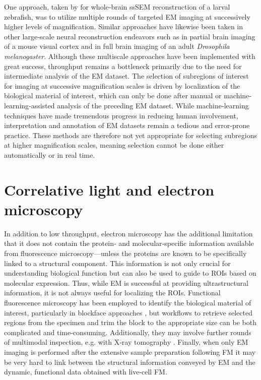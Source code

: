 One approach, taken by \textcite{hildebrand2017whole} for whole‐brain ssSEM reconstruction of a larval zebrafish, was to utilize multiple rounds of targeted EM imaging at successively higher levels of magnification. Similar approaches have likewise been taken in other large‐scale neural reconstruction endeavors such as \textcite{bock2011network} in partial brain imaging of a mouse visual cortex and \textcite{zheng2018complete} in full brain imaging of an adult \textit{Drosophila melanogaster}. Although these multiscale approaches have been implemented with great success, throughput remains a bottleneck primarily due to the need for intermediate analysis of the EM dataset. The selection of subregions of interest for imaging at successive magnification scales is driven by localization of the biological material of interest, which can only be done after manual or machine‐learning‐assisted analysis of the preceding EM dataset. While machine‐learning techniques have made tremendous progress in reducing human involvement, interpretation and annotation of EM datasets remain a tedious and error‐prone practice. These methods are therefore not yet appropriate for selecting subregions at higher magnification scales, meaning selection cannot be done either automatically or in real time.


\section{Correlative light and electron microscopy}

In addition to low throughput, electron microscopy has the additional limitation that it does not contain the protein‐ and molecular‐specific information available from fluorescence microscopy---unless the proteins are known to be specifically linked to a structural component. This information is not only crucial for understanding biological function but can also be used to guide to ROIs based on molecular expression. Thus, while EM is successful at providing ultrastructural information, it is not always useful for localizing the ROIs. Functional fluorescence microscopy has been employed to identify the biological material of interest, particularly in blockface approaches \cite{karreman2016fast}, but workflows to retrieve selected regions from the specimen and trim the block to the appropriate size can be both complicated and time‐consuming. Additionally, they may involve further rounds of multimodal inspection, e.g. with X‐ray tomography \cite{karreman2016intravital}. Finally, when only EM imaging is performed after the extensive sample preparation following FM it may be very hard to link between the structural information conveyed by EM and the dynamic, functional data obtained with live‐cell FM.


